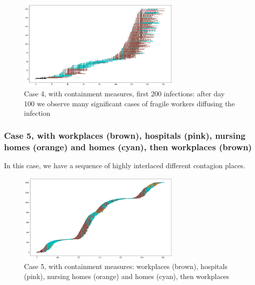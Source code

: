 \documentclass[11pt]{article}
\begin{document}
\begin{figure}[H]
\begin{center}
\includegraphics[width=0.7\textwidth]{with6b.png}%
\caption{Case 4, with containment measures, first 200 infections: after day 100 we observe many significant cases of fragile workers diffusing the infection}
\label{6b}
\end{center}
\end{figure}

\subsubsection{Case 5, with workplaces (brown), hospitals (pink), nursing homes (orange) and homes (cyan), then workplaces (brown)}
\label{c5}

In this case, we have a sequence of highly interlaced different contagion places.

\begin{figure}[H]
\begin{center}
\includegraphics[width=0.7\textwidth]{with7a.png}%
\caption{Case 5, with containment measures: workplaces (brown), hospitals (pink), nursing homes (orange) and homes (cyan), then workplaces}
\label{7a}
\end{center}
\end{figure}
\end{document}
